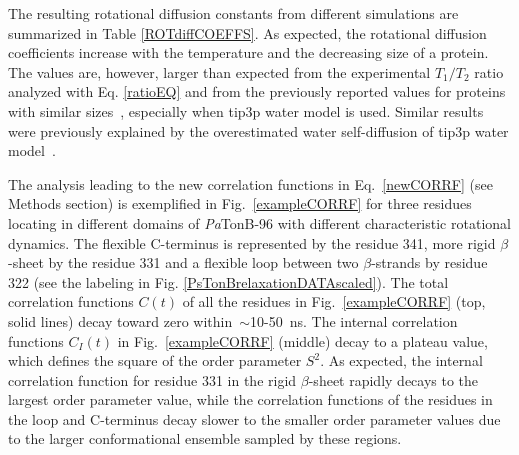 \documentclass[journal=jpcbfk,manuscript=article]{achemso}
\begin{document}
The resulting rotational diffusion constants from different simulations are
summarized in Table \ref{ROTdiffCOEFFS}.
As expected, the rotational diffusion coefficients
increase with the temperature and the decreasing size of a protein.
The values are, however, larger than 
expected from the experimental $T_1/T_2$ ratio analyzed with Eq. \ref{ratioEQ}
and from the previously reported values for proteins with similar
sizes~\cite{krishnan98}, especially when tip3p water model is used.
Similar results were previously explained by the overestimated water
self-diffusion of tip3p water model~\cite{wong08}.

The analysis leading to the new correlation functions in Eq.~\ref{newCORRF}
(see Methods section) is exemplified in
Fig.~\ref{exampleCORRF} for three residues locating in different domains of {\it Pa}TonB-96
with different characteristic rotational dynamics.
The flexible C-terminus is represented by the residue 341,
more rigid $\beta$-sheet by the residue 331 and a
flexible loop between two $\beta$-strands by residue 322
(see the labeling in Fig. \ref{PsTonBrelaxationDATAscaled}). 
The total correlation functions $C(t)$
of all the residues in Fig.~\ref{exampleCORRF}  (top, solid lines) 
decay toward zero within~$\sim$10-50~ns.
The internal correlation functions $C_I(t)$ in Fig.~\ref{exampleCORRF} (middle)
decay to a plateau value, which defines the square of the order parameter $S^2$.
As expected, the internal correlation function for residue 331 in the
rigid $\beta$-sheet rapidly decays to the largest order parameter value,
while the correlation functions of the residues in the loop and C-terminus 
decay slower to the smaller order parameter values due to the larger conformational ensemble
sampled by these regions.
\end{document}
